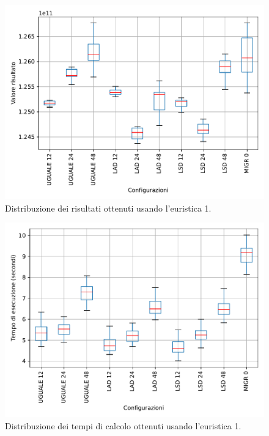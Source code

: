 \begin{figure}[H]
    \centering
    \includegraphics[scale=0.70]{img/grafico-e1-valore.pdf}
    \caption{Distribuzione dei risultati ottenuti usando l'euristica 1.}
    \label{graf:e1-valore-range}
\end{figure}

\begin{figure}[H]
    \centering
    \includegraphics[scale=0.70]{img/grafico-e1-tempo.pdf}
    \caption{Distribuzione dei tempi di calcolo ottenuti usando l'euristica 1.}
    \label{graf:e1-tempo-range}
\end{figure}

